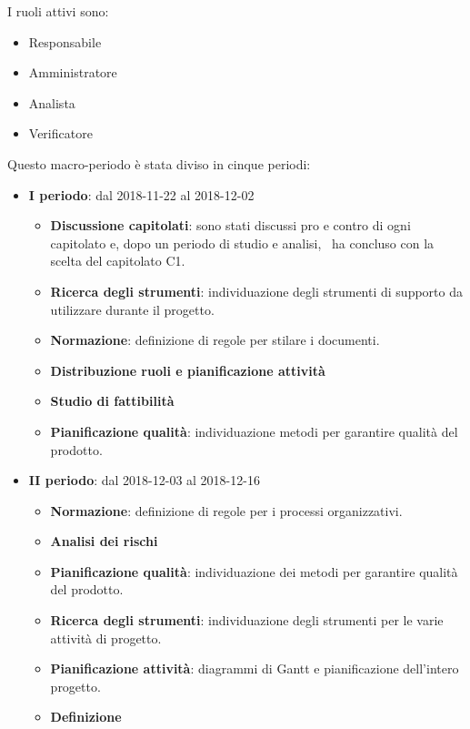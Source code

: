         I ruoli attivi sono:
        \begin{itemize}
            \item Responsabile
            \item Amministratore
            \item Analista
            \item Verificatore
        \end{itemize}
        Questo macro-periodo è stata diviso in cinque periodi:
		\begin{itemize}
			\item \textbf{I periodo}: dal 2018-11-22 al 2018-12-02
			\begin{itemize}
    	        \item \textbf{Discussione capitolati}: sono stati discussi pro e contro di ogni capitolato e, dopo un periodo di
				studio e analisi, \gruppo\ ha concluso con la scelta del capitolato C1.
    	        \item \textbf{Ricerca degli strumenti}: individuazione degli strumenti di supporto da utilizzare durante il progetto.
    	        \item \textbf{Normazione}: definizione di regole per stilare i documenti.
    	        \item \textbf{Distribuzione ruoli e pianificazione attività}
       	        \item \textbf{Studio di fattibilità}
       	        \item \textbf{Pianificazione qualità}: individuazione metodi per garantire qualità del prodotto.
			\end{itemize}
			\newpage
			\item \textbf{II periodo}: dal 2018-12-03 al 2018-12-16
			\begin{itemize}
    	        \item \textbf{Normazione}: definizione di regole per i processi organizzativi.
    	        \item \textbf{Analisi dei rischi}
    	        \item \textbf{Pianificazione qualità}: individuazione dei metodi per garantire qualità del prodotto.
       	        \item \textbf{Ricerca degli strumenti}: individuazione degli strumenti per le varie attività di progetto.
       	        \item \textbf{Pianificazione attività}: diagrammi di Gantt e pianificazione dell'intero progetto.
       	        \item \textbf{Definizione }

\end{itemize}
\end{itemize}
